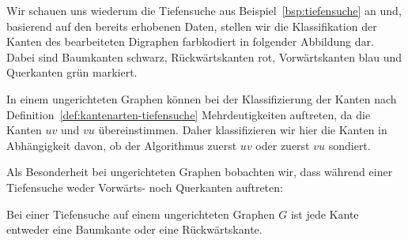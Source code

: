 \begin{bsp} 
Wir schauen uns wiederum die Tiefensuche aus Beispiel~\ref{bsp:tiefensuche} an und, basierend auf den bereits erhobenen Daten, stellen wir die Klassifikation der Kanten des bearbeiteten Digraphen farbkodiert in folgender Abbildung dar.
Dabei sind Baumkanten schwarz, Rückwärtskanten rot, Vorwärtskanten blau und Querkanten grün markiert.

\begin{center} 
\end{center} 
\end{bsp} 


\begin{bem}
In einem ungerichteten Graphen können bei der Klassifizierung der Kanten nach Definition~\ref{def:kantenarten-tiefensuche} Mehrdeutigkeiten auftreten, da die Kanten $uv$ und $vu$ übereinstimmen.
Daher klassifizieren wir hier die Kanten in Abhängigkeit davon, ob der Algorithmus zuerst $uv$ oder zuerst $vu$ sondiert.

Als Besonderheit bei ungerichteten Graphen bobachten wir, dass während einer
Tiefensuche weder Vorwärts- noch Querkanten auftreten:
\end{bem}

\begin{thm}
Bei einer Tiefensuche auf einem ungerichteten Graphen $G$ ist jede Kante entweder eine Baumkante oder eine Rückwärtskante.
\end{thm}

